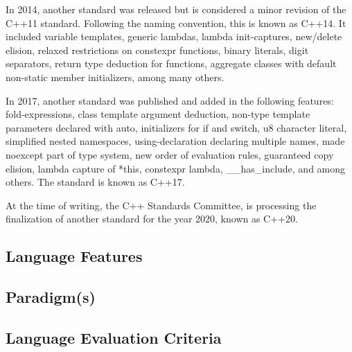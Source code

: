 \documentclass[12pt]{article}
\begin{document}
In 2014, another standard was released but is considered a minor revision of the C++11 standard. Following the naming convention, this is known as C++14. It included variable templates, generic lambdas, lambda init-captures, new/delete elision, relaxed restrictions on constexpr functions, binary literals, digit separators, return type deduction for functions, aggregate classes with default non-static member initializers, among many others.

In 2017, another standard was published and added in the following features: fold-expressions, class template argument deduction, non-type template parameters declared with auto, initializers for if and switch, u8 character literal, simplified nested namespaces, using-declaration declaring multiple names, made noexcept part of type system, new order of evaluation rules, guaranteed copy elision, lambda capture of *this, constexpr lambda, \_\_has\_include, and among others. The standard is known as C++17.

At the time of writing, the C++ Standards Committee, is processing the finalization of another standard for the year 2020, known as C++20.

\subsection{Language Features}
\subsection{Paradigm(s)}

\subsection{Language Evaluation Criteria}

\iffalse



%
%
%
\subsubsection{Data Types}
\subsubsection{Binding, Scoping, Referencing}
\subsubsection{Expressions}
\subsubsection{Statements and Control Structures}
\subsubsection{Procedures and Subprograms}
\fi
\end{document}
